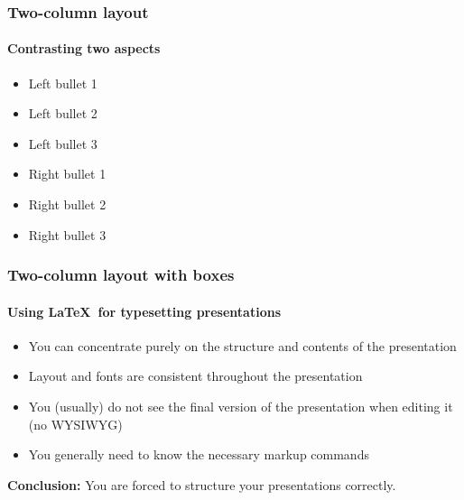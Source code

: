 \begin{frame}[t]
    \frametitle{Two-column layout}
    \framesubtitle{Contrasting two aspects}

    \twocolumnlayout
    {
        \begin{itemize}
            \item Left bullet 1
            \item Left bullet 2
            \item Left bullet 3
        \end{itemize}
    }{
        \begin{itemize}
            \item Right bullet 1
            \item Right bullet 2
            \item Right bullet 3
        \end{itemize}
    }
\end{frame}

\begin{frame}[t]
    \frametitle{Two-column layout with boxes}
    \framesubtitle{Using \LaTeX\ for typesetting presentations}

    \twocolumnlayout
    {
        \begin{block}{}
            \begin{itemize}
                \item You can concentrate purely on the structure and contents of the presentation
                \item Layout and fonts are consistent throughout the presentation
            \end{itemize}
        \end{block}
    }{
        \begin{block}{}
            \begin{itemize}
                \item You (usually) do not see the final version of the presentation when editing it (no WYSIWYG)
                \item You generally need to know the necessary markup commands
            \end{itemize}
        \end{block}
    }

    \vspace*{0.5em}
    \textbf{\textcolor{ercisred}{Conclusion:}} You are forced to structure your presentations correctly.
\end{frame}

